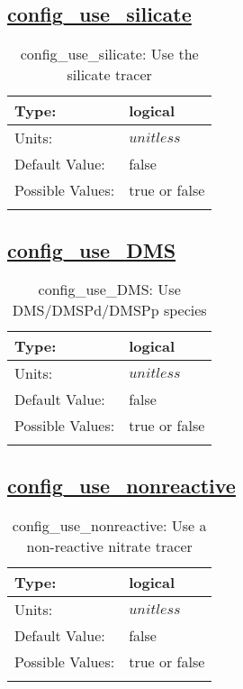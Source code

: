 \subsection[config\_use\_silicate]{\hyperref[sec:nm_tab_biogeochemistry]{config\_use\_silicate}}
\label{subsec:nm_sec_config_use_silicate}
\begin{center}
\begin{longtable}{| p{2.0in} || p{4.0in} |}
    \hline
    Type: & logical \\
    \hline
    Units: & $unitless$ \\
    \hline
    Default Value: & false \\
    \hline
    Possible Values: & true or false \\
    \hline
    \caption{config\_use\_silicate: Use the silicate tracer}
\end{longtable}
\end{center}
\subsection[config\_use\_DMS]{\hyperref[sec:nm_tab_biogeochemistry]{config\_use\_DMS}}
\label{subsec:nm_sec_config_use_DMS}
\begin{center}
\begin{longtable}{| p{2.0in} || p{4.0in} |}
    \hline
    Type: & logical \\
    \hline
    Units: & $unitless$ \\
    \hline
    Default Value: & false \\
    \hline
    Possible Values: & true or false \\
    \hline
    \caption{config\_use\_DMS: Use DMS/DMSPd/DMSPp species}
\end{longtable}
\end{center}
\subsection[config\_use\_nonreactive]{\hyperref[sec:nm_tab_biogeochemistry]{config\_use\_nonreactive}}
\label{subsec:nm_sec_config_use_nonreactive}
\begin{center}
\begin{longtable}{| p{2.0in} || p{4.0in} |}
    \hline
    Type: & logical \\
    \hline
    Units: & $unitless$ \\
    \hline
    Default Value: & false \\
    \hline
    Possible Values: & true or false \\
    \hline
    \caption{config\_use\_nonreactive: Use a non-reactive nitrate tracer}
\end{longtable}
\end{center}
